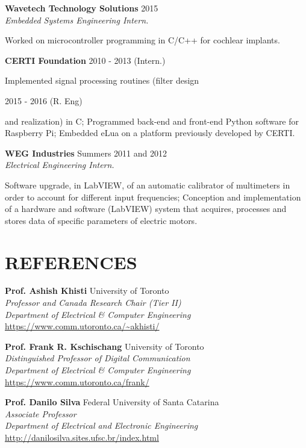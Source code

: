 \documentclass[margin, line]{res}
\begin{document}
\begin{resume}
\textbf{Wavetech Technology Solutions} \hfill 2015\\
{\sl Embedded Systems Engineering Intern.}\\
\begin{small}
    Worked on microcontroller programming in C/C++ for cochlear implants.
\end{small}

\newpage
\textbf{CERTI Foundation} \hfill 2010 - 2013 (Intern.)\\
\begin{small}
    Implemented signal processing routines (filter design 
\end{small}
\hfill 2015 - 2016 (R. Eng)\\ 
\begin{small}
    and realization) in C; Programmed back-end and front-end Python software for Raspberry Pi; Embedded eLua on a platform previously developed by CERTI.
\end{small}

\textbf{WEG Industries}  \hfill Summers 2011 and 2012\\
{\sl Electrical Engineering Intern.}\\
\begin{small}
    Software upgrade, in LabVIEW, of an automatic calibrator of multimeters in order to account for different input frequencies; Conception and implementation of a hardware and software (LabVIEW) system that acquires, processes and stores data of specific parameters of electric motors.
\end{small}

\section{REFERENCES}
\textbf{Prof. Ashish Khisti} \hfill University of Toronto\\
{\sl Professor and Canada Research Chair (Tier II)}\\
{\sl Department of Electrical \& Computer Engineering}\\
\url{https://www.comm.utoronto.ca/~akhisti/}

\textbf{Prof. Frank R. Kschischang} \hfill University of Toronto\\
{\sl Distinguished Professor of Digital Communication}\\
{\sl Department of Electrical \& Computer Engineering}\\
\url{https://www.comm.utoronto.ca/frank/}

\textbf{Prof. Danilo Silva} \hfill Federal University of Santa Catarina\\
{\sl Associate Professor}\\
{\sl Department of Electrical and Electronic Engineering}\\
\url{http://danilosilva.sites.ufsc.br/index.html}


\end{resume}
\end{document}
